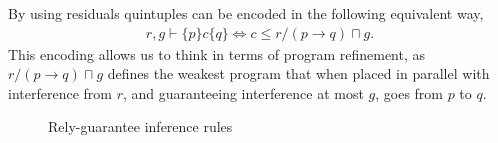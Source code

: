 \documentclass{llncs}
\begin{document}
By using residuals quintuples can be encoded in the following
equivalent way,
\begin{align}
r, g \vdash \{p\} c \{q\} \iff c \le r/(p \rightarrow q) \sqcap g \label{refine}.
\end{align}
This encoding allows us to think in terms of program
refinement, as $r/(p \rightarrow q) \sqcap g$ defines the weakest
program that when placed in parallel with interference from $r$, and
guaranteeing interference at most $g$, goes from $p$ to $q$.

\begin{figure}[tbh]
\centering
\begin{prooftree}
\end{prooftree}

\begin{prooftree}
\end{prooftree}

\begin{prooftree}
\end{prooftree}

\begin{prooftree}
\end{prooftree}

\begin{prooftree}
\end{prooftree}

\begin{prooftree}
\end{prooftree}
\caption{Rely-guarantee inference rules}
\label{fig:rgrules}
\end{figure}

\end{document}
